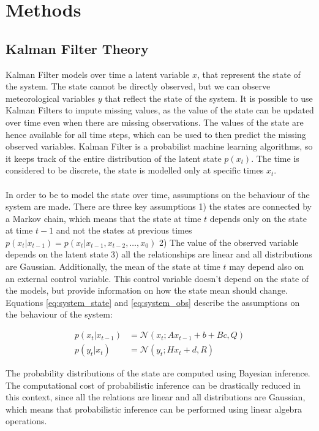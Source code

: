 \documentclass{article}
\newcommand{\norm}[3]{\mathcal{N}\left(#1; #2, #3\right)} %
\let\Oldsection\section
\renewcommand{\section}{\FloatBarrier\Oldsection}
\let\Oldsubsection\subsection
\renewcommand{\subsection}{\FloatBarrier\Oldsubsection}
\begin{document}
\section{Methods}

\subsection{Kalman Filter Theory}

Kalman Filter models over time a latent variable $x$, that represent the state of the system. The state cannot be directly observed, but we can observe meteorological variables $y$ that reflect the state of the system. It is possible to use Kalman Filters to impute missing values, as the value of the state can be updated over time even when there are missing observations. The values of the state are hence available for all time steps, which can be used to then predict the missing observed variables.
Kalman Filter is a probabilist machine learning algorithms, so it keeps track of the entire distribution of the latent state $p(x_t)$. The time is considered to be discrete, the state is modelled only at specific times $x_t$.  

\paragraph{} In order to be to model the state over time, assumptions on the behaviour of the system are made. There are three key assumptions 1) the states are connected by a Markov chain, which means that the state at time $t$ depends only on the state at time $t-1$ and not the states at previous times $p(x_t|x_{t-1}) = p(x_t|x_{t-1}, x_{t-2}, \hdots, x_0)$ 2) The value of the observed variable depends on the latent state 3) all the relationships are linear and all distributions are Gaussian. Additionally, the mean of the state at time $t$ may depend also on an external control variable. This control variable doesn't depend on the state of the models, but provide information on how the state mean should change.
Equations \ref{eq:system_state} and \ref{eq:system_obs} describe the assumptions on the behaviour of the system:

\begin{align}
p(x_t | x_{t-1}) &= \norm{x_t}{Ax_{t-1} + b + Bc}{Q} \label{eq:system_state}\\
p(y_t | x_t) &= \norm{y_t}{Hx_t + d}{R} \label{eq:system_obs}
\end{align}

The probability distributions of the state are computed using Bayesian inference. The computational cost of probabilistic inference can be drastically reduced in this context, since all the relations are linear and all distributions are Gaussian, which means that probabilistic inference can be performed using linear algebra operations.
\end{document}
